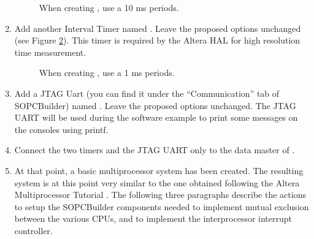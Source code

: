 \begin{enumerate}
\begin{figure}
\caption{\label{fig:tutorial_sys_clk_timer}When creating
, use a 10 ms periods.}
\end{figure}

\item Add another Interval Timer named . Leave
  the proposed options unchanged (see Figure
  \ref{fig:tutorial_interval_timer_highres}). This timer is required
  by the Altera HAL for high resolution time measurement.
%
\begin{figure}

\caption{\label{fig:tutorial_interval_timer_highres}When creating
, use a 1 ms periods.}
\end{figure}


\item Add a JTAG Uart (you can find it under the ``Communication'' tab
  of SOPCBuilder) named . Leave the proposed
  options unchanged. The JTAG UART will be used during the software
  example to print some messages on the consoles using printf.

\item Connect the two timers and the JTAG UART only to the data master
  of .

\item At that point, a basic multiprocessor system has been
  created. The resulting system is at this point very similar to the
  one obtained following the Altera Multiprocessor Tutorial
  \cite{Altera-multicpu-tutorial}. The following three paragraphs
  describe the actions to setup the SOPCBuilder components needed to
  implement mutual exclusion between the various CPUs, and to
  implement the interprocessor interrupt controller.


\end{enumerate}

